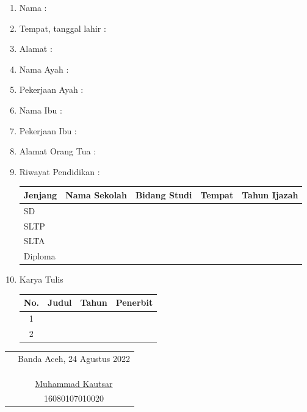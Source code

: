 \begin{enumerate}
    \item Nama :
    \item Tempat, tanggal lahir :
    \item Alamat :
    \item Nama Ayah :
    \item Pekerjaan Ayah :
    \item Nama Ibu :
    \item Pekerjaan Ibu :
    \item Alamat Orang Tua :
    \item Riwayat Pendidikan :
        \hspace*{1cm}
        \begin{table}[h!]
            \begin{tabular}{|l|l|l|l|l|} %
            \hline %
            Jenjang & Nama Sekolah & Bidang Studi & Tempat & Tahun Ijazah\\
            \hline %
            SD   & & & & \\
            \hline
            SLTP   & & & & \\
            \hline
            SLTA   & & & & \\
            \hline
            Diploma  & & & & \\
            \hline %
            \end{tabular}
        \end{table}
    \item Karya Tulis
        \hspace*{1cm}
        \begin{table}[h!]
            \begin{tabular}{|c|l|l|l|} %
            \hline %
            No. & Judul & Tahun & Penerbit\\
            \hline %
            1   & & & \\
            \hline
            2   & & & \\
            \hline %
            \end{tabular}
        \end{table}
\end{enumerate}

\begin{tabular}{p{7.5cm}c}
	&Banda Aceh, 24 Agustus 2022\\
	&\\
	&\\
	&\\
	&\underline{Muhammad Kautsar}\\
	&16080107010020
\end{tabular}

